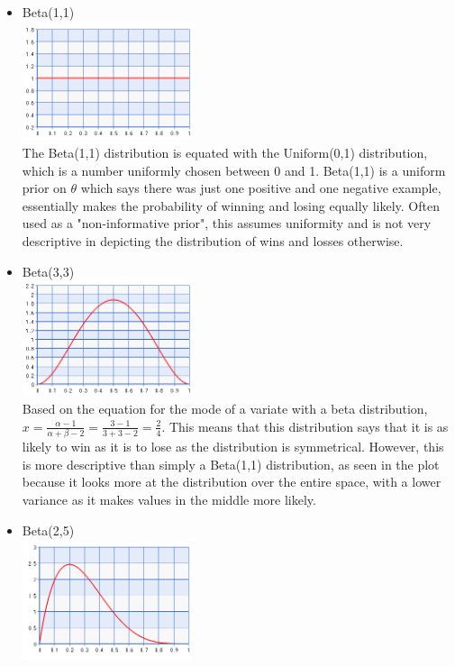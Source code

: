\documentclass[11pt]{article}
\begin{document}
\begin{enumerate}[a.]
\begin{itemize}
\item Beta(1,1)\\
\includegraphics[width=50mm]{beta11.png}\\
The Beta(1,1) distribution is equated with the Uniform(0,1) distribution, which is a number uniformly chosen between 0 and 1. Beta(1,1) is a uniform prior on $\theta$ which says there was just one positive and one negative example, essentially makes the probability of winning and losing equally likely. Often used as a "non-informative prior", this assumes uniformity and is not very descriptive in depicting the distribution of wins and losses otherwise.
\item Beta(3,3)\\
\includegraphics[width=50mm]{beta33.png}\\
Based on the equation for the mode of a variate with a beta distribution, $x = \frac{\alpha - 1}{\alpha + \beta - 2}=\frac{3-1}{3+3-2}=\frac{2}{4}$. This means that this distribution says that it is as likely to win as it is to lose as the distribution is symmetrical. However, this is more descriptive than simply a Beta(1,1) distribution, as seen in the plot because it looks more at the distribution over the entire space, with a lower variance as it makes values in the middle more likely.
\item Beta(2,5)\\
\includegraphics[width=50mm]{beta25.png}\\

\end{itemize}
\end{enumerate}
\end{document}
